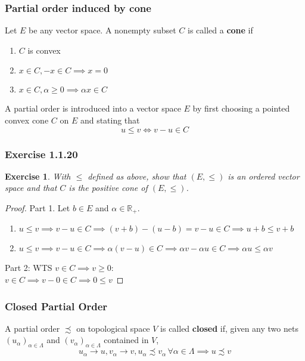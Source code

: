 \documentclass[11pt,xcolor={dvipsnames},hyperref={pdftex,pdfpagemode=UseNone,hidelinks,pdfdisplaydoctitle=true},usepdftitle=false]{beamer}
\newtheorem{exercise}{Exercise}[section]
\begin{document}
\begin{frame}
\frametitle{Partial order induced by cone}
\begin{definition}
Let $E$ be any vector space. A nonempty subset $C$ is called a \textbf{cone} if
\begin{enumerate}
\item $C$ is convex
\item $x\in C, -x\in C\implies x=0$
\item $x\in C, \alpha \ge 0 \implies \alpha x\in C$
\end{enumerate}
\end{definition}
A partial order is introduced into a vector space $E$ by first choosing a pointed convex cone $C$ on $E$ and stating that
$$
u\le v\iff v-u\in C
$$
\end{frame}
\begin{frame}
\frametitle{Exercise 1.1.20}
\begin{exercise}
With $\leq$ defined as above, show that $(E, \leq)$ is an ordered vector space and that $C$ is the positive cone of $(E, \leq)$.
\end{exercise}

\begin{proof}
Part 1. Let $b\in E$ and $\alpha \in\mathbb{R}_+$.
\begin{enumerate}
\item $u\le v\implies v-u\in C\implies (v+b)-(u-b)=v-u\in C\implies u+b\le v+b$
\item $u\le v\implies v-u\in C\implies \alpha (v-u)\in C\implies \alpha v-\alpha u\in C\implies \alpha u\le \alpha v$
\end{enumerate}
Part 2: WTS $v\in C\implies v\ge 0$:\\
$v\in C\implies v-0\in C\implies 0\le v$
\end{proof}
\end{frame}
\begin{frame}
\frametitle{Closed Partial Order}
\begin{definition}
A partial order $\precsim$ on topological space $V$ is called \textbf{closed} if, given any two nets $(u_\alpha)_{\alpha\in \Lambda}$ and $(v_\alpha)_{\alpha\in\Lambda}$ contained in $V$,
$$
u_\alpha\to u, v_\alpha\to v, u_\alpha\precsim v_\alpha \,\forall \alpha\in\Lambda\implies u\precsim v 
$$
\end{definition}
\end{frame}
\end{document}
